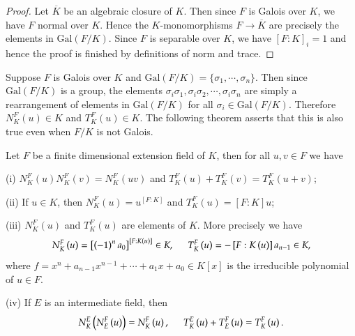 \begin{proof}
Let $\overline{K}$ be an algebraic closure of $K$. Then since $F$ is Galois over $K$, we have $F$ normal over $K$. Hence the $K$-monomorphisms $F\to\overline{K}$ are precisely the elements in $\mathrm{Gal}(F/K)$. Since $F$ is separable over $K$, we have $[F:K]_i=1$ and hence the proof is finished by definitions of norm and trace.
\end{proof}
Suppose $F$ is Galois over $K$ and $\mathrm{Gal}(F/K)=\{\sigma_1,\cdots,\sigma_n\}$. Then since $\mathrm{Gal}(F/K)$ is a group, the elements $\sigma_i\sigma_1,\sigma_i\sigma_2,\cdots,\sigma_i\sigma_n$ are simply a rearrangement of elements in $\mathrm{Gal}(F/K)$ for all $\sigma_i\in\mathrm{Gal}(F/K)$. Therefore $N_K^F(u)\in K$ and $T_K^F(u)\in K$. The following theorem asserts that this is also true even when $F/K$ is not Galois.
\begin{theorem}
Let $F$ be a finite dimensional extension field of $K$, then for all $u,v\in F$ we have \par
(i) $N_K^F(u)N_K^F(v)=N_K^F(uv)$ and $T_K^F(u)+T_K^F(v)=T_K^F(u+v)$;\par
(ii) If $u\in K$, then $N_K^F(u)=u^{[F:K]}$ and $T_K^F(u)=[F:K]u$;\par
(iii) $N_K^F(u)$ and $T_K^F(u)$ are elements of $K$. More precisely we have 
$$
N_{K}^{F}\left( u \right) =\left[ \left( -1 \right) ^na_0 \right] ^{\left[ F:K\left( u \right) \right]}\in K,\hspace{0.5cm}T_{K}^{F}\left( u \right) =-\left[ F:K\left( u \right) \right] a_{n-1}\in K,
$$
where $f=x^n+a_{n-1}x^{n-1}+\cdots+a_1x+a_0\in K[x]$ is the irreducible polynomial of $u\in F$.\par
(iv) If $E$ is an intermediate field, then 
$$
N_{K}^{E}\left( N_{E}^{F}\left( u \right) \right) =N_{K}^{F}\left( u \right) ,\hspace{0.5cm}T_{K}^{E}\left( u \right) +T_{E}^{F}\left( u \right) =T_{K}^{F}\left( u \right) .
$$
\end{theorem}

